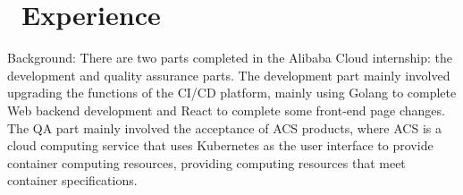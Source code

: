 \documentclass{resume}
\begin{document}
\section{\faUsers\ Experience}
Background: There are two parts completed in the Alibaba Cloud internship: the development and quality assurance parts. The development part mainly involved upgrading the functions of the CI/CD platform, mainly using Golang to complete Web backend development and React to complete some front-end page changes. The QA part mainly involved the acceptance of ACS products, where ACS is a cloud computing service that uses Kubernetes as the user interface to provide container computing resources, providing computing resources that meet container specifications.
\end{document}
